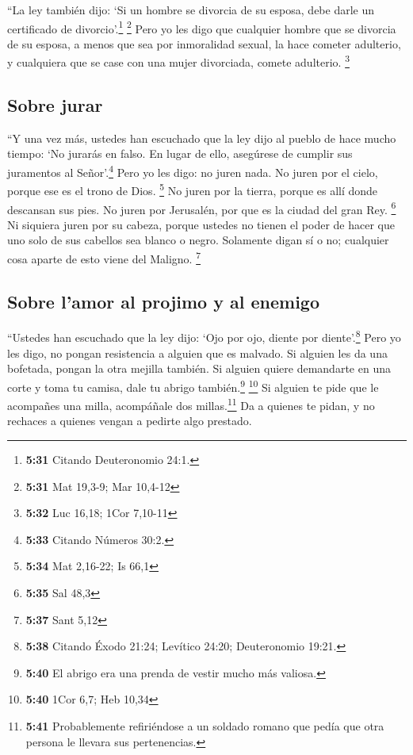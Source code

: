  ``La ley también dijo: `Si un hombre se divorcia de su
esposa, debe darle un certificado de divorcio'.\footnote{\textbf{5:31}
  Citando Deuteronomio 24:1.} \footnote{\textbf{5:31} Mat 19,3-9; Mar
  10,4-12}  Pero yo les digo que cualquier hombre que se
divorcia de su esposa, a menos que sea por inmoralidad sexual, la hace
cometer adulterio, y cualquiera que se case con una mujer divorciada,
comete adulterio. \footnote{\textbf{5:32} Luc 16,18; 1Cor 7,10-11}

\hypertarget{sobre-jurar}{%
\subsection{Sobre jurar}\label{sobre-jurar}}

 ``Y una vez más, ustedes han escuchado que la ley dijo
al pueblo de hace mucho tiempo: `No jurarás en falso. En lugar de ello,
asegúrese de cumplir sus juramentos al Señor'.\footnote{\textbf{5:33}
  Citando Números 30:2.}  Pero yo les digo: no juren
nada. No juren por el cielo, porque ese es el trono de Dios. \footnote{\textbf{5:34}
  Mat 2,16-22; Is 66,1}  No juren por la tierra, porque
es allí donde descansan sus pies. No juren por Jerusalén, por que es la
ciudad del gran Rey. \footnote{\textbf{5:35} Sal 48,3} 
Ni siquiera juren por su cabeza, porque ustedes no tienen el poder de
hacer que uno solo de sus cabellos sea blanco o negro. 
Solamente digan sí o no; cualquier cosa aparte de esto viene del
Maligno. \footnote{\textbf{5:37} Sant 5,12}

\hypertarget{sobre-lamor-al-projimo-y-al-enemigo}{%
\subsection{Sobre l'amor al projimo y al
enemigo}\label{sobre-lamor-al-projimo-y-al-enemigo}}

 ``Ustedes han escuchado que la ley dijo: `Ojo por ojo,
diente por diente'.\footnote{\textbf{5:38} Citando Éxodo 21:24; Levítico
  24:20; Deuteronomio 19:21.}  Pero yo les digo, no
pongan resistencia a alguien que es malvado. Si alguien les da una
bofetada, pongan la otra mejilla también.  Si alguien
quiere demandarte en una corte y toma tu camisa, dale tu abrigo
también.\footnote{\textbf{5:40} El abrigo era una prenda de vestir mucho
  más valiosa.} \footnote{\textbf{5:40} 1Cor 6,7; Heb 10,34}
 Si alguien te pide que le acompañes una milla,
acompáñale dos millas.\footnote{\textbf{5:41} Probablemente refiriéndose
  a un soldado romano que pedía que otra persona le llevara sus
  pertenencias.}  Da a quienes te pidan, y no rechaces a
quienes vengan a pedirte algo prestado.

